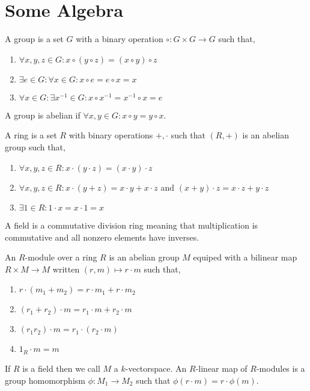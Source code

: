 \documentclass[12pt]{extarticle}
\theoremstyle{definition}
\newenvironment{definition}[1][Definition:]{\begin{trivlist}
\item[\hskip \labelsep {\bfseries #1}]}{\end{trivlist}}
\begin{document}
\section{Some Algebra}

\begin{definition}
A group is a set $G$ with a binary operation $\circ : G \times G \to G$ such that,
\begin{enumerate}
\item $\forall x,y,z \in G : x \circ (y \circ z) = (x \circ y) \circ z$
\item $\exists e \in G : \forall x \in G : x \circ e = e \circ x = x$
\item $\forall x \in G : \exists x^{-1} \in G : x \circ x^{-1} = x^{-1} \circ x = e$ 
\end{enumerate}
A group is abelian if $\forall x,y \in G: x \circ y = y \circ x$.
\end{definition}

\begin{definition}
A ring is a set $R$ with binary operations $+, \cdot$ such that $(R, +)$ is an abelian group such that,
\begin{enumerate}
\item $\forall x,y,z \in R : x \cdot (y \cdot z) = (x \cdot y) \cdot z$
\item $\forall x,y,z \in R : x \cdot (y + z) = x \cdot y + x \cdot z$  and $(x + y) \cdot z = x \cdot z + y \cdot z$
\item $\exists 1 \in R : 1 \cdot x = x \cdot 1 = x$
\end{enumerate}
\end{definition}

\begin{definition}
A field is a commutative division ring meaning that multiplication is commutative and all nonzero elements have inverses. 
\end{definition}

\begin{definition}
An $R$-module over a ring $R$ is an abelian group $M$ equiped with a bilinear map $R \times M \to M$ written $(r, m) \mapsto r \cdot m$ such that,
\begin{enumerate}
\item $r \cdot (m_1 + m_2) = r \cdot m_1 + r \cdot m_2$
\item $(r_1 + r_2) \cdot m = r_1 \cdot m + r_2 \cdot m$
\item $(r_1 r_2) \cdot m = r_1 \cdot (r_2 \cdot m)$
\item $1_R \cdot m = m$
\end{enumerate}
If $R$ is a field then we call $M$ a $k$-vectorspace. An $R$-linear map of $R$-modules is a group homomorphism $\phi : M_1 \to M_2$ such that $\phi(r \cdot m) = r \cdot \phi(m)$.
\end{definition}
\end{document}
